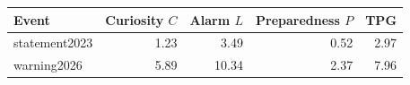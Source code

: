 \begin{tabular}{lrrrr}
\toprule
Event & Curiosity $C$ & Alarm $L$ & Preparedness $P$ & TPG \\
\midrule
statement2023 & 1.23 & 3.49 & 0.52 & 2.97 \\
warning2026 & 5.89 & 10.34 & 2.37 & 7.96 \\
\bottomrule
\end{tabular}
